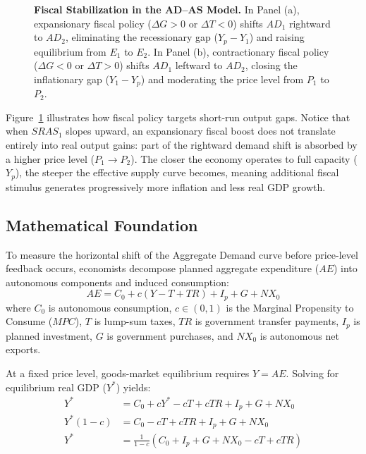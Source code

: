 \documentclass[11pt,letterpaper]{article}
\begin{document}
\begin{figure}[htbp]
\caption{\textbf{Fiscal Stabilization in the AD--AS Model.} In Panel (a), expansionary fiscal policy ($\Delta G > 0$ or $\Delta T < 0$) shifts $AD_1$ rightward to $AD_2$, eliminating the recessionary gap ($Y_p - Y_1$) and raising equilibrium from $E_1$ to $E_2$. In Panel (b), contractionary fiscal policy ($\Delta G < 0$ or $\Delta T > 0$) shifts $AD_1$ leftward to $AD_2$, closing the inflationary gap ($Y_1 - Y_p$) and moderating the price level from $P_1$ to $P_2$.}
\label{fig:fiscal-adas}
\end{figure}

Figure~\ref{fig:fiscal-adas} illustrates how fiscal policy targets short-run output gaps. Notice that when $SRAS_1$ slopes upward, an expansionary fiscal boost does not translate entirely into real output gains: part of the rightward demand shift is absorbed by a higher price level ($P_1 \rightarrow P_2$). The closer the economy operates to full capacity ($Y_p$), the steeper the effective supply curve becomes, meaning additional fiscal stimulus generates progressively more inflation and less real GDP growth.

\subsection*{Mathematical Foundation}
To measure the horizontal shift of the Aggregate Demand curve before price-level feedback occurs, economists decompose planned aggregate expenditure ($AE$) into autonomous components and induced consumption:
\begin{equation}
AE = C_0 + c(Y - T + TR) + I_p + G + NX_0
\end{equation}
where $C_0$ is autonomous consumption, $c \in (0,1)$ is the Marginal Propensity to Consume ($MPC$), $T$ is lump-sum taxes, $TR$ is government transfer payments, $I_p$ is planned investment, $G$ is government purchases, and $NX_0$ is autonomous net exports.

At a fixed price level, goods-market equilibrium requires $Y = AE$. Solving for equilibrium real GDP ($Y^*$) yields:
\begin{align}
Y^* &= C_0 + cY^* - cT + cTR + I_p + G + NX_0 \nonumber \\
Y^*(1 - c) &= C_0 - cT + cTR + I_p + G + NX_0 \nonumber \\
Y^* &= \frac{1}{1 - c}\left(C_0 + I_p + G + NX_0 - cT + cTR\right)
\end{align}
\end{document}
